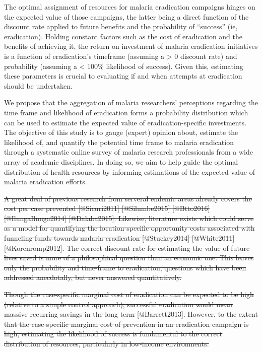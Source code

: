 \documentclass[]{article}
\begin{document}
The optimal assignment of resources for malaria eradication campaigns
hinges on the expected value of those campaigns, the latter being a
direct function of the discount rate applied to future benefits and the
probability of ``success'' (ie, eradication). Holding constant factors
such as the cost of eradication and the benefits of achieving it, the
return on investment of malaria eradication initiatives is a function of
eradication's timeframe (assuming a \textgreater{} 0 discount rate) and
probability (assuming a \textless{} 100\% likelihood of success). Given
this, estimating these parameters is crucial to evaluating if and when
attempts at eradication should be undertaken.

We propose that the aggregation of malaria researchers' perceptions
regarding the time frame and likelihood of eradication forms a
probability distribution which can be used to estimate the expected
value of eradication-specific investments. The objective of this study
is to gauge (expert) opinion about, estimate the likelihood of, and
quantify the potential time frame to malaria eradication through a
systematic online survey of malaria research professionals from a wide
array of academic disciplines. In doing so, we aim to help guide the
optimal distribution of health resources by informing estimations of the
expected value of malaria eradication efforts.

\st{A great deal of previous research from serveral endemic areas already covers the cost per case prevented [@Sicuri2011] [@Silumbe2015] [@Btto2016] [@IlungaIlunga2014] [@Dalaba2015]. Likewise, literature exists which could serve as a model for quantifying the location-specific opportunity costs associated with funneling funds towards malaria eradication [@Stuckey2014] [@White2011] [@Korenromp2012]. The correct discount rate for estimating the value of future lives saved is more of a philosophical question than an economic one. This leaves only the probability and time-frame to eradication, questions which have been addressed anecdotally, but never answered quantitatively.}

\st{Though the case-specific marginal cost of eradication can be expected to be high (relative to a simple control approach), successful eradication would mean massive recurring savings in the long-term [@Barrett2013]. However, to the extent that the case-specific marginal cost of prevention in an eradication campaign is high, estimating the likelihood of success is fundamental to the correct distribution of resources, particularly in low-income environments. }
\end{document}
